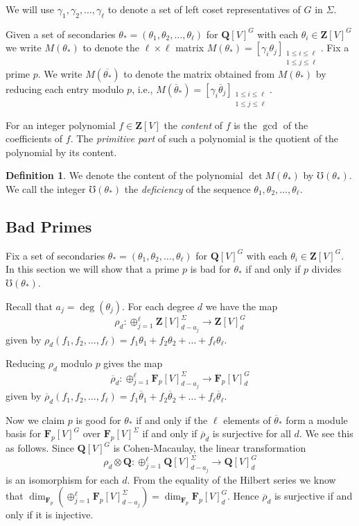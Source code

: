 \documentclass[12pt]{amsart}
\renewcommand{\leq}{\leqslant}
\newcommand{\QQ}{\mathbf{Q}} %
\newcommand{\ZZ}{\mathbf{Z}} %
\newcommand{\FF}{\mathbf{F}} %
\newcommand{\QQ}{\mathbb{Q}} %
\newcommand{\ZZ}{\mathbb{Z}} %
\newcommand{\FF}{\mathbb{F}} %
\theoremstyle{definition}
\newtheorem{defn}[thm]{Definition}
\newcommand{\btheta}{{\overline{\theta}}}
\newcommand{\bth}{{{\theta_*}}} %
\begin{document}
We will use $\gamma_1, \gamma_2,\dots,\gamma_\ell$ to denote a set of left 
coset representatives of $G$ in $\Sigma$.

Given a set of secondaries $\bth=(\theta_1,\theta_2,\dots,\theta_\ell)$ for 
$\QQ[V]^G$ with each $\theta_i \in \ZZ[V]^G$ we write $M(\bth)$ to 
denote the $\ell \times \ell$ matrix 
$M(\bth) = [\gamma_i \theta_j]_{\substack{1 \leq i \leq \ell\\1 \leq j \leq \ell}}$.
Fix a prime $p$.  We write $M(\overline\bth)$ to denote
the matrix obtained from $M(\bth)$ by reducing each entry modulo $p$, 
i.e., $M(\overline{\theta}_*) 
= [\gamma_i \btheta_j]_{\substack{1\leq i \leq \ell \\ 1 \leq j \leq \ell}}$.


For an integer polynomial $f\in \ZZ[V]$ the \emph{content} of $f$
is the $\gcd$ of the coefficients of $f$.  The \emph{primitive part} of such a polynomial is the quotient of the polynomial by its content. 
\begin{defn}\label{content}
We denote the content of the polynomial $\det M(\bth)$ by 
$\mho(\bth)$. 
We call the integer $\mho(\bth)$ the \emph{deficiency} of the 
sequence $\theta_1,\theta_2,\dots,\theta_\ell$.
\end{defn}


\subsection{Bad Primes}
Fix a set of secondaries $\bth=(\theta_1,\theta_2,\dots,\theta_\ell)$ for
 $\QQ[V]^G$ with each $\theta_i \in \ZZ[V]^G$.
 In this section we will show that a prime $p$ is bad for 
 $\bth$ if and only if $p$ divides $\mho(\bth)$.  

 
Recall that $a_j = \deg(\theta_j)$.
For each degree $d$ we have the map 
$$\rho_d : \oplus_{j=1}^\ell \ZZ[V]^{\Sigma}_{d-a_j}  
  \to \ZZ[V]_d^G$$ given by 
  $\rho_d(f_1,f_2,\dots,f_\ell) = f_1\theta_1 + f_2\theta_2+ \dots +f_\ell\theta_\ell$.


Reducing $\rho_d$ modulo $p$ gives the map 
$$\overline{\rho}_d : \oplus_{j=1}^\ell \FF_p[V]^{\Sigma}_{d-a_j}  
  \to \FF_p[V]_d^G$$ given by 
  $\overline{\rho}_d(f_1,f_2,\dots,f_\ell) = f_1\btheta_1 + f_2\btheta_2+ \dots +f_\ell\btheta_\ell$.

 Now we claim $p$ is good for $\bth$ if and only if the $\ell$ elements of $\overline{\theta}_*$  form a module basis for 
  $\FF_p[V]^G$ over $\FF_p[V]^{\Sigma}$ if and only if  $\overline{\rho}_d$ is surjective for all $d$.  We see
  this as follows.
   Since $\QQ[V]^G$ is Cohen-Macaulay, the linear transformation
 $$\rho_d \otimes \QQ : \oplus_{j=1}^\ell \QQ[V]^{\Sigma}_{d-a_j}  
  \to \QQ[V]_d^G$$ is an isomorphism for each $d$. 
From the equality of the Hilbert series we know that $\dim_{\FF_p} \left(\oplus_{j=1}^\ell \FF_p[V]^{\Sigma}_{d-a_j}\right) = \dim_{\FF_p} \FF_p[V]^{G}_{d}$.  Hence 
  $\overline{\rho}_d$ is surjective if and only if it is
  injective.
\end{document}
